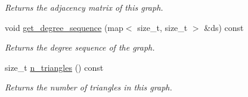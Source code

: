 \begin{DoxyCompactItemize}
\begin{DoxyCompactList}\small\item\em Returns the adjacency matrix of this graph. \end{DoxyCompactList}\item 
void \hyperlink{classlgraph_1_1utils_1_1xxgraph_aff73f5ac4cd2732caa0c528eb1c1833c}{get\-\_\-degree\-\_\-sequence} (map$<$ size\-\_\-t, size\-\_\-t $>$ \&ds) const 
\begin{DoxyCompactList}\small\item\em Returns the degree sequence of the graph. \end{DoxyCompactList}\item 
size\-\_\-t \hyperlink{classlgraph_1_1utils_1_1xxgraph_ad4f25a8b29c6f26bc1567cb9c5a564ba}{n\-\_\-triangles} () const 
\begin{DoxyCompactList}\small\item\em Returns the number of triangles in this graph. \end{DoxyCompactList}\end{DoxyCompactItemize}
